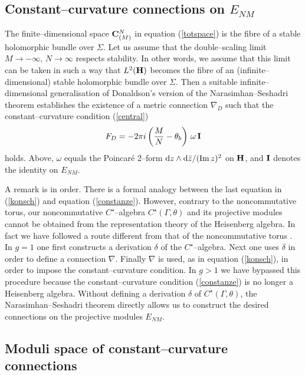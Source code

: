 \documentclass[a4paper,a4paper]{article}
\begin{document}
\subsection{Constant--curvature connections on $E_{NM}$}\label{cccon}  
  
The finite--dimensional space ${\bf C}^N_{(M)}$ in equation (\ref{totspace})
is the fibre of a stable holomorphic bundle over $\Sigma$. Let us 
assume that the double--scaling limit $M\to -\infty$, $N\to\infty$ 
respects stability. In other words, we assume that this limit can 
be taken in such a way that $L^2({\bf H})$ becomes the fibre of an 
(infinite--dimensional) stable holomorphic bundle over $\Sigma$.
Then a suitable infinite--dimensional generalisation of Donaldson's version 
of the Narasimhan--Seshadri theorem establishes the existence of a metric 
connection $\nabla_D$ such that the constant--curvature condition (\ref{central}) 
\begin{equation}  
F_D=-2\pi i \left({M\over N}-\theta_b\right)\,\omega\,{\bf  I} 
\label{constanze}
\end{equation}  
holds. Above, $\omega$ equals the Poincar\'e 2--form 
${\rm d}z\wedge {\rm d}\bar z/({\rm Im}\,z)^2$ on ${\bf H}$, 
and ${\bf I}$ denotes the identity on $E_{NM}$.

A remark is in order. There is a formal analogy between the last equation 
in (\ref{konsch}) and equation (\ref{constanze}). However, contrary to the 
noncommutative torus, our noncommutative $C^{\star}$--algebra $C^{\star}(\Gamma,\theta)$ 
and its projective modules cannot be obtained from the representation theory 
of the Heisenberg algebra. In fact we have followed a route different 
from that of the noncommutative torus \cite{SCHWARZ}. In $g=1$ one first 
constructs a derivation $\delta$ of the $C^{\star}$--algebra. 
Next one uses $\delta$ in order to define a connection $\nabla$. 
Finally $\nabla$ is used, as in equation (\ref{konsch}), in order to 
impose the constant--curvature condition. In $g>1$ we have bypassed this
procedure because the constant--curvature condition (\ref{constanze}) 
is no longer a Heisenberg algebra. Without defining a derivation $\delta$
of $C^{\star}(\Gamma, \theta)$, the Narasimhan--Seshadri theorem directly 
allows us to construct the desired connections on the projective modules 
$E_{NM}$.

\subsection{Moduli space of constant--curvature connections}\label{xyz}  
  
\end{document}
